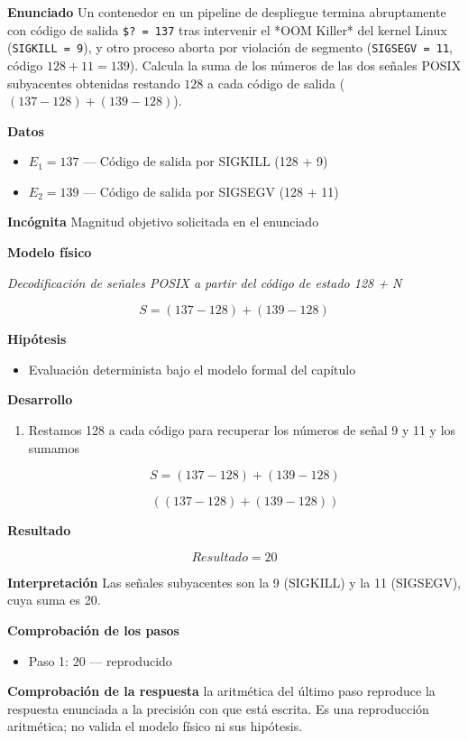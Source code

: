 \documentclass{book}
\begin{document}
\begin{tcolorbox}[title={Problema resuelto}, studiumworked, breakable]

\noindent\textbf{Enunciado}
Un contenedor en un pipeline de despliegue termina abruptamente con código de salida \texttt{\$? = 137} tras intervenir el *OOM Killer* del kernel Linux (\texttt{SIGKILL = 9}), y otro proceso aborta por violación de segmento (\texttt{SIGSEGV = 11}, código \(128 + 11 = 139\)). Calcula la suma de los números de las dos señales POSIX subyacentes obtenidas restando \(128\) a cada código de salida (\((137 - 128) + (139 - 128)\)).

\noindent\textbf{Datos}
\begin{itemize}
\item $E_{1} = 137$ — Código de salida por SIGKILL (128 + 9)
\item $E_{2} = 139$ — Código de salida por SIGSEGV (128 + 11)
\end{itemize}

\noindent\textbf{Incógnita}
Magnitud objetivo solicitada en el enunciado

\noindent\textbf{Modelo físico}

\noindent\textit{Decodificación de señales POSIX a partir del código de estado 128 + N}

\[
S = (137 - 128) + (139 - 128)
\]

\noindent\textbf{Hipótesis}
\begin{itemize}
\item Evaluación determinista bajo el modelo formal del capítulo
\end{itemize}

\noindent\textbf{Desarrollo}
\begin{enumerate}
\item
Restamos 128 a cada código para recuperar los números de señal 9 y 11 y los sumamos

\[
S = (137 - 128) + (139 - 128)
\]

\[
\left(\left(137-128\right)+\left(139-128\right)\right)
\]
\end{enumerate}

\noindent\textbf{Resultado}

\[
Resultado = 20
\]

\noindent\textbf{Interpretación}
Las señales subyacentes son la 9 (SIGKILL) y la 11 (SIGSEGV), cuya suma es 20.

\noindent\textbf{Comprobación de los pasos}
\begin{itemize}
\item Paso 1: $20$ — reproducido
\end{itemize}

\noindent\textbf{Comprobación de la respuesta} la aritmética del último paso reproduce la respuesta enunciada a la precisión con que está escrita. Es una reproducción aritmética; no valida el modelo físico ni sus hipótesis.
\end{tcolorbox}
\end{document}

